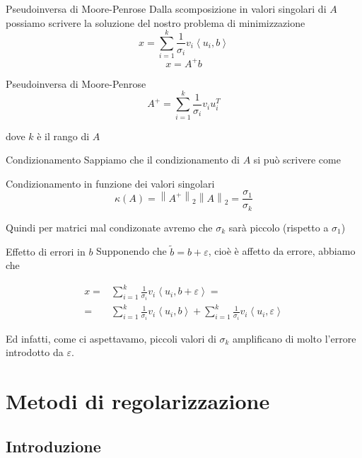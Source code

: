 \documentclass{beamer}
\theoremstyle{plain}
\theoremstyle{definition}
\theoremstyle{remark}
\newcommand{\set}[1]{\left\{#1\right\}}
\newcommand{\ang}[1]{\left<#1\right>}
\newcommand{\norm}[1]{\left\|#1\right\|}
\begin{document}
\begin{frame}{Pseudoinversa di Moore-Penrose}
  Dalla scomposizione in valori singolari di $A$ possiamo scrivere la
  soluzione del nostro problema di minimizzazione
  \[ x = \sum _{i=1} ^k \frac{1}{\sigma _i} v_i \ang{u_i,b} \]
  \[ x = A^+ b \]
  \begin{block}{Pseudoinversa di Moore-Penrose}
    \[ A^+ = \sum _{i=1} ^k \frac{1}{\sigma _i} v_i u_i ^T\]
  \end{block}
  dove $k$ è il rango di $A$
\end{frame}

\begin{frame}{Condizionamento}
  Sappiamo che il condizionamento di $A$ si può scrivere come
  \begin{block}{Condizionamento in funzione dei valori singolari}
    \[ \kappa (A) = \norm{A^+}_2\norm{A}_2 = \frac{\sigma _1}{\sigma
    _k} \]
  \end{block}

  Quindi per matrici mal condizonate avremo che $\sigma _k$ sarà
  piccolo (rispetto a $\sigma_1$)
\end{frame}

\begin{frame}{Effetto di errori in $b$}
  Supponendo che $\tilde b = b+ \varepsilon$, cioè è affetto da
  errore, abbiamo che 
  
  \begin{align*}
    x =& \sum _{i=1} ^k \frac{1}{\sigma _i} v_i \ang{u_i,b +
      \varepsilon} = \\
    =& \sum _{i=1} ^k \frac{1}{\sigma _i} v_i \ang{u_i,b} + \sum
    _{i=1} ^k \frac{1}{\sigma _i} v_i \ang{u_i,\varepsilon}
  \end{align*}

  Ed infatti, come ci aspettavamo, piccoli valori di $\sigma_k$
  amplificano di molto l'errore introdotto da $\varepsilon$.
\end{frame}


\section{Metodi di regolarizzazione}

\subsection{Introduzione}
\end{document}
